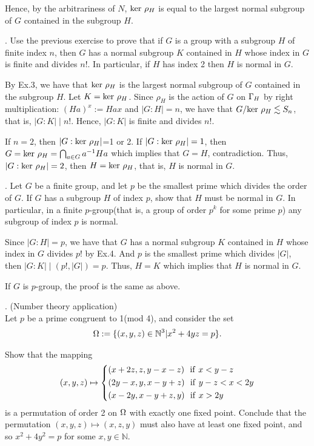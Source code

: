 \documentclass[12pt]{amsart}
\def\r{\rho} \def\o{\sigma} \def\t{\tau} \def\w{\omega} \def\k{\kappa}
\def\m{\medskip} \def\l{\noindent} \def\x{$\!\,$} \def\J{$-\!\,$}
\def\pf{\noindent {\it Proof.\ }}
\begin{document}
Hence, by the arbitrariness of $N$, ${\rm ker}\ \r_H$ is equal to the largest normal subgroup of $G$ contained in the subgroup $H$.

\m
\m

\l 4. Use the previous exercise to prove that if $G$ is a group with a subgroup $H$ of finite index $n$, then $G$ has a normal subgroup $K$ contained in $H$ whose index in $G$ is finite and divides $n!$. In particular, if $H$ has index 2 then $H$ is normal in $G$.
\m

\pf By Ex.3, we have that ${\rm ker}\ \r_H$ is the largest normal subgroup of $G$ contained in the subgroup $H$.
Let $K= {\rm ker}\ \r_H$.
Since $\r_H$ is the action of $G$ on $\Gamma_H$ by right multiplication: $(Ha)^x:=Hax$ and $|G:H|=n$, we have that $G/ {\rm ker}\ \r_H \lesssim S_n$, that is, $|G:K|\mid n!$.
Hence, $|G:K|$ is finite and divides $n!$.

If $n=2$, then $|G:{\rm ker}\ \r_H|$=1 or 2. If $|G:{\rm ker}\ \r_H|=1$, then $G={\rm ker}\ \r_H=\bigcap_{a\in G}a^{-1}Ha$ which implies that $G=H$, contradiction. Thus, $|G:{\rm ker}\ \r_H|=2$, then $H={\rm ker}\ \r_H$, that is, $H$ is normal in $G$.

\m
\m

\l 5. Let $G$ be a finite group, and let $p$ be the smallest prime which divides the order of $G$. If $G$ has a subgroup $H$ of index $p$, show that $H$ must be normal in $G$. In particular, in a finite $p$-group(that is, a group of order $p^k$ for some prime $p$) any subgroup of index $p$ is normal.
\m

\pf Since $|G:H|=p$, we have that $G$ has a normal subgroup $K$ contained in $H$ whose index in $G$ divides $p!$ by Ex.4. 
And $p$ is the smallest prime which divides $|G|$, then $|G:K|\mid (p!,|G|)=p$.
Thus, $H=K$ which implies that $H$ is normal in $G$. 

If $G$ is $p$-group, the proof is the same as above.

\m
\m

\l 6. (Number theory application)\\
Let $p$ be a prime congruent to 1(mod 4), and consider the set 
\begin{align*}
 \Omega:=\{(x,y,z)\in \mathbb{N}^3|x^2+4yz=p\}.
\end{align*}

Show that the mapping
\begin{align*}
 (x,y,z)\mapsto 
 \left\{
 \begin{aligned}
 &(x+2z,z,y-x-z)\ \  {\rm if}\  x<y-z \\
 &(2y-x,y,x-y+z)\ \  {\rm if}\  y-z<x<2y \\
 &(x-2y,x-y+z,y)\ \  {\rm if}\  x>2y
 \end{aligned}
 \right.
\end{align*}
is a permutation of order 2 on $\Omega$ with exactly one fixed point. Conclude that the permutation $(x,y,z)\mapsto (x,z,y)$ must also have at least one fixed point, and so $x^2+4y^2=p$ for some $x,y\in \mathbb{N}$.
\m
\end{document}
